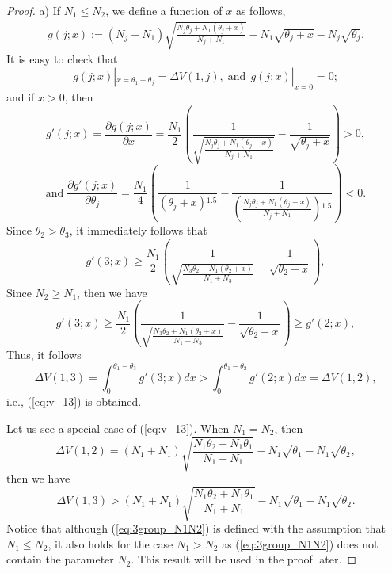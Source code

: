 \documentclass[twocolumn,10pt,twosided]{IEEEtran}
\begin{document}
\begin{proof}
a) If $N_1\le N_2$, we define a function of $x$ as follows,
\begin{eqnarray*}
g(j;x)\!:=\!(\!N_j\!+\!N_1\!)\!\sqrt{\!\frac{N_j\theta_j\!+\!N_1(\theta_j\!+\!x)}{N_j+N_1}}\!-\!N_1\!\sqrt{\theta_j\!+\!x}
\!-\!N_j\!\sqrt{\theta_j}.
\end{eqnarray*}
It is easy to check that
$$g(j;x)|_{x=\theta_{1}-\theta_{j}}=\Delta V(1,j),\;\text{and}\;\, g(j;x)|_{x=0}=0;$$
and if $x>0$, then
\begin{equation*}
\label{eq:closed_neighbor_D}
 g'(j;x)\!=\!\frac{\partial g(j;x)}{\partial x}\!=\!\frac{N_{1}}{2}  \left(\!\!\frac{1}{\sqrt{\frac{N_j\theta_j+N_1(\!\theta_j+x\!)}{N_j+N_1}}}\!-\!\frac{1}{\sqrt{\theta_{j}+x}}\!\!\right)\!> \!0,
\end{equation*}
\begin{equation*}
\text{and}\;\label{eq:closed_neighbor_D_D}
 \frac{\partial g'(j;x)}{\partial \theta_j}=\frac{N_{1}}{4}\!\! \left(\!\!\frac{1}{\left(\theta_{j}+x\right)\!^{1.5}}\!-\!\frac{1}{\left(\frac{N_j\theta_j+N_1(\theta_j+x)}{N_j+N_1}\right)\!^{1.5}}\!\!\right)\!\!<\!0.
\end{equation*}
Since $\theta_2>\theta_3$, it immediately follows that
$$    g'(3;x)\ge
\frac{N_{1}}{2}
\left(\frac{1}{\sqrt{\frac{N_3\theta_2+N_1(\theta_2+x)}{N_1+N_3}}}-\frac{1}{\sqrt{\theta_{2}+x}}\right),
$$
Since $N_2\ge N_1$, then we have
$$    g'(3;x)\ge
\frac{N_{1}}{2}\!
\left(\!\frac{1}{\sqrt{\frac{N_3\theta_2+N_1(\theta_2+x)}{N_1+N_3}}}-\frac{1}{\sqrt{\theta_{2}+x}}\!\right)\!\ge
g'(2;x),
$$
Thus, it follows
\begin{equation*}
    \Delta V(1,3)=\int^{\theta_1\!-\!\theta_3}_0\!\!\!\!\!\!\!\!\!g'(3;x)dx >\int^{\theta_1\!-\!\theta_2}_0\!\!\!\!\!\!\!\!\!g'(2;x)dx=\Delta V(1,2),
\end{equation*}
i.e., (\ref{eq:v_13}) is obtained.

Let us see a special case of  (\ref{eq:v_13}). When  $N_1=N_2$, then
$$\Delta V(1,2)\!=\!(N_1\!\!+\!\!N_1)\sqrt{\frac{N_1\theta_2\!\!+\!\!N_1\theta_1}{N_1+N_1}}\!-\!N_1\sqrt{\theta_1}\!-\!N_1\sqrt{\theta_2},$$
then we have
\begin{equation}
\label{eq:3group_N1N2}
    \Delta V(1,3)\!>\!(N_1\!\!+\!\!N_1)\sqrt{\frac{N_1\theta_2\!\!+\!\!N_1\theta_1}{N_1+N_1}}\!-\!N_1\sqrt{\theta_1}\!-\!N_1\sqrt{\theta_2}.
\end{equation}
Notice that although (\ref{eq:3group_N1N2}) is defined with the
assumption that $N_1\leq N_2$, it also holds for the case $N_1>N_2$
as (\ref{eq:3group_N1N2}) does not contain the parameter $N_2$. This
result will be used in the proof later.


\end{proof}
\end{document}
